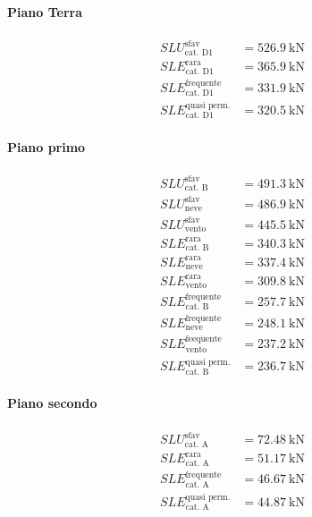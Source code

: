 \paragraph*{Piano Terra} 
\begin{align*} 
	SLU^{\text{sfav}}_{\text{cat. D1}}		&= \SI{526.9}{\kilo\newton} \\	
	SLE^{\text{rara}}_{\text{cat. D1}} 		&= \SI{365.9}{\kilo\newton} \\
	SLE^{\text{frequente}}_{\text{cat. D1}} &= \SI{331.9}{\kilo\newton} \\
	SLE^{\text{quasi perm.}}_{\text{cat. D1}}&= \SI{320.5}{\kilo\newton}
\end{align*}
\paragraph*{Piano primo}
\begin{align*} 
	SLU^{\text{sfav}}_{\text{cat. B}}		&= \SI{491.3}{\kilo\newton} \\
	SLU^{\text{sfav}}_{\text{neve}}	 	    &= \SI{486.9}{\kilo\newton} \\
	SLU^{\text{sfav}}_{\text{vento}}		&= \SI{445.5}{\kilo\newton} \\	
	SLE^{\text{rara}}_{\text{cat. B}} 		&= \SI{340.3}{\kilo\newton} \\
	SLE^{\text{rara}}_{\text{neve}} 		&= \SI{337.4}{\kilo\newton} \\
	SLE^{\text{rara}}_{\text{vento}} 		&= \SI{309.8}{\kilo\newton} \\
	SLE^{\text{frequente}}_{\text{cat. B}} 	&= \SI{257.7}{\kilo\newton} \\
	SLE^{\text{frequente}}_{\text{neve}} 	&= \SI{248.1}{\kilo\newton} \\
	SLE^{\text{feequente}}_{\text{vento}}   &= \SI{237.2}{\kilo\newton} \\
	SLE^{\text{quasi perm.}}_{\text{cat. B}}&= \SI{236.7}{\kilo\newton}
\end{align*}
\paragraph*{Piano secondo}
\begin{align*} 
	SLU^{\text{sfav}}_{\text{cat. A}}		&= \SI{72.48}{\kilo\newton} \\	
	SLE^{\text{rara}}_{\text{cat. A}} 		&= \SI{51.17}{\kilo\newton} \\
	SLE^{\text{frequente}}_{\text{cat. A}} 	&= \SI{46.67}{\kilo\newton} \\
	SLE^{\text{quasi perm.}}_{\text{cat. A}}&= \SI{44.87}{\kilo\newton}
\end{align*}
